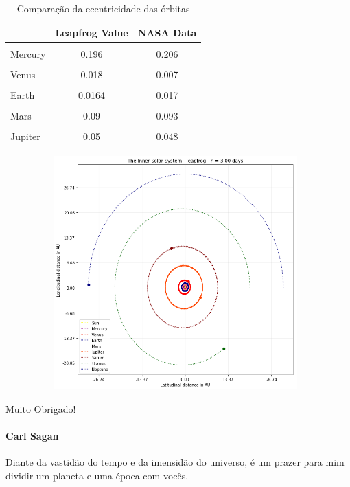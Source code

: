 \documentclass{beamer}
\begin{document}
\begin{frame}
    \begin{table}[H]
    \centering
    \caption{Comparação da ecentricidade das órbitas}
    \label{tab:exTable1}
    \smallskip
    \begin{tabular}{|l|c|c|}
    \hline
    & Leapfrog Value & NASA Data\\[0.5ex]
    \hline
    &&\\[-2ex]
    Mercury & 0.196 & 0.206\\[0.5ex]
    \hline
    &&\\[-2ex]
    Venus & 0.018 & 0.007\\[0.5ex]
    \hline
    &&\\[-2ex]
    Earth & 0.0164 & 0.017\\[0.5ex]
    \hline
    &&\\[-2ex]
    Mars & 0.09 & 0.093\\[0.5ex]
    \hline
    &&\\[-2ex]
    Jupiter & 0.05 & 0.048\\[0.5ex]
    \hline
    \end{tabular}
    \end{table}
\end{frame}

\begin{frame}
  \begin{figure}[h]
    \vspace{-0.5cm}
    \includegraphics[width=110mm, height = 90mm]{resources/outer.png}
  \end{figure}
\end{frame}

    \begin{frame}{Muito Obrigado!}
      \framesubtitle{Carl Sagan}

      \begin{block}{}
        Diante da vastidão do \alert{tempo} e da imensidão do \alert{universo}, é um prazer para mim dividir um \alert{planeta} e uma \alert{época} com vocês.
      \end{block}
    \end{frame}
\end{document}
